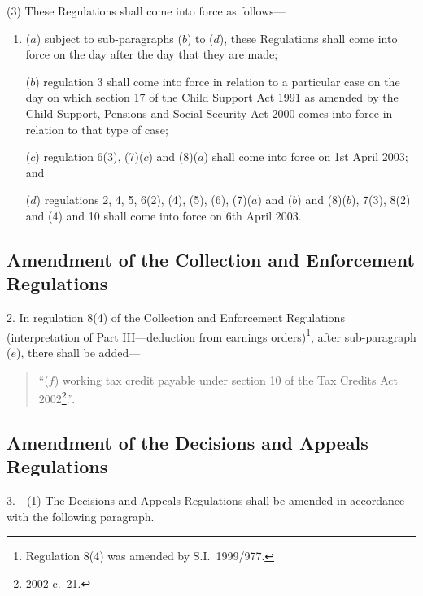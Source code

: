 \documentclass[12pt,a4paper]{article}
\begin{document}
(3) These Regulations shall come into force as follows—
\begin{enumerate}\item[]
($a$) subject to sub-paragraphs ($b$)  to ($d$), these Regulations shall come into force on the day after the day that they are made;

($b$) regulation 3 shall come into force in relation to a particular case on the day on which section 17 of the Child Support Act 1991 as amended by the Child Support, Pensions and Social Security Act 2000 comes into force in relation to that type of case;

($c$) regulation 6(3), (7)($c$)  and (8)($a$)  shall come into force on 1st April 2003; and

($d$) regulations 2, 4, 5, 6(2), (4), (5), (6), (7)($a$)  and ($b$)  and (8)($b$), 7(3), 8(2) and (4) and 10 shall come into force on 6th April 2003.
\end{enumerate}

\subsection[2. Amendment of the Collection and Enforcement Regulations]{Amendment of the Collection and Enforcement Regulations}

2.  In regulation 8(4) of the Collection and Enforcement Regulations (interpretation of Part III—deduction from earnings orders)\footnote{Regulation 8(4) was amended by S.I.\ 1999/977.}, after sub-paragraph ($e$), there shall be added—
\begin{quotation}
“($f$) working tax credit payable under section 10 of the Tax Credits Act 2002\footnote{2002 c.\ 21.}.”.
\end{quotation}

\subsection[3. Amendment of the Decisions and Appeals Regulations]{Amendment of the Decisions and Appeals Regulations}

3.---(1)  The Decisions and Appeals Regulations shall be amended in accordance with the following paragraph.
\end{document}
